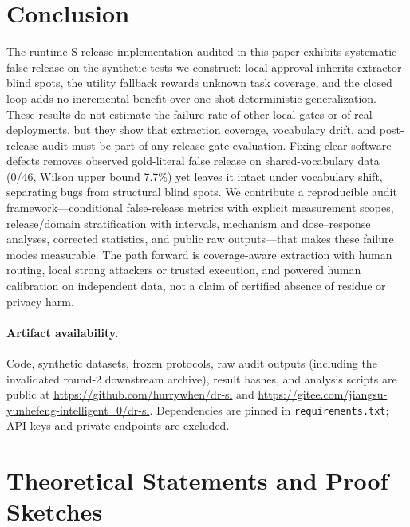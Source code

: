 \documentclass[11pt,a4paper]{article}
\begin{document}
\section{Conclusion}
The runtime-S release implementation audited in this paper exhibits systematic false release on the synthetic tests we construct: local approval inherits extractor blind spots, the utility fallback rewards unknown task coverage, and the closed loop adds no incremental benefit over one-shot deterministic generalization. These results do not estimate the failure rate of other local gates or of real deployments, but they show that extraction coverage, vocabulary drift, and post-release audit must be part of any release-gate evaluation. Fixing clear software defects removes observed gold-literal false release on shared-vocabulary data (0/46, Wilson upper bound 7.7\%) yet leaves it intact under vocabulary shift, separating bugs from structural blind spots. We contribute a reproducible audit framework---conditional false-release metrics with explicit measurement scopes, release/domain stratification with intervals, mechanism and dose--response analyses, corrected statistics, and public raw outputs---that makes these failure modes measurable. The path forward is coverage-aware extraction with human routing, local strong attackers or trusted execution, and powered human calibration on independent data, not a claim of certified absence of residue or privacy harm.

\paragraph{Artifact availability.} Code, synthetic datasets, frozen protocols, raw audit outputs (including the invalidated round-2 downstream archive), result hashes, and analysis scripts are public at \url{https://github.com/hurrywhen/dr-sl} and \url{https://gitee.com/jiangsu-yunhefeng-intelligent_0/dr-sl}. Dependencies are pinned in \texttt{requirements.txt}; API keys and private endpoints are excluded.

\appendix

\section{Theoretical Statements and Proof Sketches}\label{sec:theory}
\end{document}
